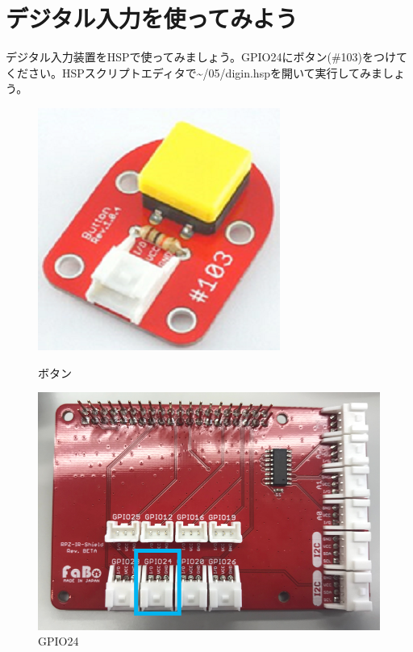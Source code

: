 \newpage
\section{デジタル入力を使ってみよう}
デジタル入力装置をHSPで使ってみましょう。GPIO24にボタン(\#103)をつけてください。HSPスクリプトエディタで\textasciitilde /05/digin.hspを開いて実行してみましょう。\\
\begin{figure}[H]
  \begin{minipage}[t]{0.3\columnwidth}
    \centering
 \includegraphics[width=\linewidth]{images/chap05/text05-img028.png}
    \caption{ボタン}
  \end{minipage}
  \begin{minipage}[t]{0.5\columnwidth}
    \centering
    \includegraphics[width=\linewidth]{images/chap05/text05-img029.png}
    \caption{GPIO24}
  \end{minipage}
\end{figure}

